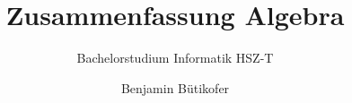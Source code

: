 \title{Zusammenfassung Algebra}
\subtitle{Bachelorstudium Informatik HSZ-T}
\author{Benjamin Bütikofer}
